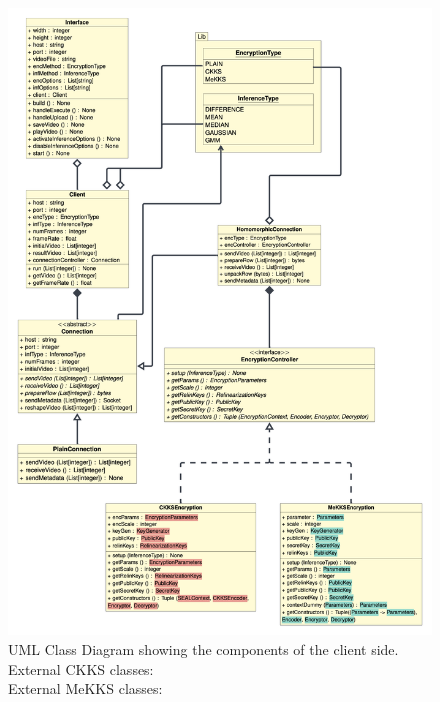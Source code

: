 \begin{figure}[htp]
    \centering
    \includegraphics[scale=0.24]{figures/clientClasses}
    \captionsetup{justification=centering}
    \caption[Client UML Class Diagram]{UML Class Diagram showing the components of the client side.\medskip\\External CKKS classes: \hl{\quad\quad\quad\quad}\smallskip\\External MeKKS classes: \hl{\quad\quad\quad\quad}}
    \label{fig:clientUML}
\end{figure}
        

